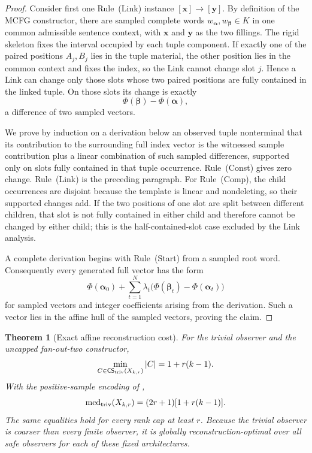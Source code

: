 \documentclass[11pt]{article}
\newtheorem{theorem}{Theorem}[section]
\theoremstyle{definition}
\theoremstyle{remark}
\newcommand{\mcd}{\operatorname{mcd}}
\newcommand{\CS}{\mathsf{CS}}
\begin{document}
\begin{proof}
Consider first one Rule~(Link) instance \([\mathbf x]\to[\mathbf y]\).
By definition of the MCFG constructor, there are sampled complete words
\(w_{\boldsymbol\alpha},w_{\boldsymbol\beta}\in K\) in one common
admissible sentence context, with \(\mathbf x\) and \(\mathbf y\) as the
two fillings.  The rigid skeleton fixes the interval occupied by each tuple
component.  If exactly one of the paired positions \(A_j,B_j\) lies in the
tuple material, the other position lies in the common context and fixes the
index, so the Link cannot change slot \(j\).  Hence a Link can change only
those slots whose two paired positions are fully contained in the linked
tuple.  On those slots its change is exactly
\[
 \Phi(\boldsymbol\beta)-\Phi(\boldsymbol\alpha),
\]
a difference of two sampled vectors.

We prove by induction on a derivation below an observed tuple nonterminal that
its contribution to the surrounding full index vector is the witnessed sample
contribution plus a linear combination of such sampled differences, supported
only on slots fully contained in that tuple occurrence.  Rule~(Const) gives
zero change.  Rule~(Link) is the preceding paragraph.  For Rule~(Comp), the
child occurrences are disjoint because the template is linear and
nondeleting, so their supported changes add.  If the two positions of one
slot are split between different children, that slot is not fully contained
in either child and therefore cannot be changed by either child; this is the
half-contained-slot case excluded by the Link analysis.

A complete derivation begins with Rule~(Start) from a sampled root word.
Consequently every generated full vector has the form
\[
 \Phi(\boldsymbol\alpha_0)
 +\sum_{t=1}^N \lambda_t
   \bigl(\Phi(\boldsymbol\beta_t)-\Phi(\boldsymbol\alpha_t)\bigr)
\]
for sampled vectors and integer coefficients arising from the derivation.
Such a vector lies in the affine hull of the sampled vectors, proving the
claim.
\end{proof}

\begin{theorem}[Exact affine reconstruction cost]
\label{thm:X-cost}
For the trivial observer and the uncapped fan-out-two constructor,
\[
 \min_{C\in\CS_{\rm triv}(X_{k,r})}|C|
 =1+r(k-1).
\]
With the positive-sample encoding of \cite{KuriyamaMCFG},
\[
 \mcd_{\rm triv}(X_{k,r})
 =(2r+1)[1+r(k-1)].
\]
The same equalities hold for every rank cap at least \(r\).  Because the
trivial observer is coarser than every finite observer, it is globally
reconstruction-optimal over all safe observers for each of these fixed
architectures.
\end{theorem}
\end{document}
